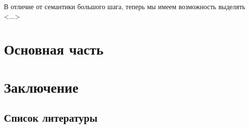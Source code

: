 \documentclass[aps,12pt,final,oneside,onecolumn,musixtex,superscriptaddress,centertags]{article}
\begin{document}
    В отличие от семантики большого шага, теперь мы имеем возможность выделять <...>

  \newpage

  \section{Основная часть}
  \newpage

  \section{Заключение}

  \subsection{Список литературы}
  
  
\end{document}
